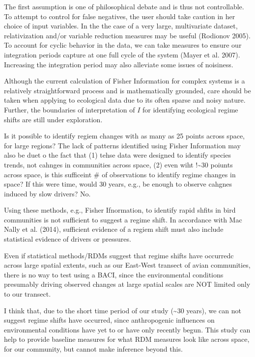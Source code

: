 \documentclass[12pt,twoside,openany]{reedthesis}
\begin{document}
The first assumption is one of philosophical debate and is thus not
controllable. To attempt to control for false negatives, the user should
take caution in her choice of input variables. In the the case of a very
large, multivariate dataset, relativization and/or variable reduction
measures may be useful (Rodionov 2005). To account for cyclic behavior
in the data, we can take measures to ensure our integration periods
capture at one full cycle of the system (Mayer et al. 2007). Increasing
the integration period may also alleviate some issues of noisiness.

Although the current calculation of Fisher Information for complex
systems is a relatively straightforward process and is mathematically
grounded, care should be taken when applying to ecological data due to
its often sparse and noisy nature. Further, the boundaries of
interpretation of \(I\) for identifying ecological regime shifts are
still under exploration.

Is it possible to identify regiem changes with as many as 25 points
across space, for large regions? The lack of patterns identified using
Fisher Information may also be duet o the fact that (1) tehse data were
designed to identify species trends, not cahnges in communities across
space, (2) even wiht !\textasciitilde{}30 poiunts across space, is this
sufficeint \# of observations to identify regime changes in space? If
this were time, would 30 years, e.g., be enough to observe cahgnes
induced by slow drivers? No.

Using these methods, e.g., Fisher Ifnormation, to identify rapid shfits
in bird communities is not sufficient to suggest a regime shift. In
accordance with Mac Nally et al. (2014), sufficient evidence of a regiem
shift must also include statistical evidence of drivers or pressures.

Even if statistical methods/RDMs suggest that regime shifts have
occurredc across large spatial extents, such as our East-West transect
of avian communities, there is no way to test using a BACI, since the
environmental conditions presumably driving observed changes at large
spatial scales are NOT limited only to our transect.

I think that, due to the short time period of our study
(\textasciitilde{}30 years), we can not suggest regime shifts have
occurred, since anthropogenic influences on environmental conditions
have yet to or have only recently begun. This study can help to provide
baseline measures for what RDM measures look like across space, for our
community, but cannot make inference beyond this.
\end{document}
